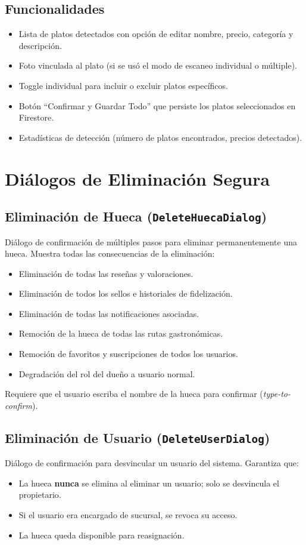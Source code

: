 \documentclass[11pt, a4paper, oneside]{report}
\begin{document}
\subsection{Funcionalidades}
\begin{itemize}
  \item Lista de platos detectados con opción de editar nombre, precio, categoría y descripción.
  \item Foto vinculada al plato (si se usó el modo de escaneo individual o múltiple).
  \item Toggle individual para incluir o excluir platos específicos.
  \item Botón ``Confirmar y Guardar Todo'' que persiste los platos seleccionados en Firestore.
  \item Estadísticas de detección (número de platos encontrados, precios detectados).
\end{itemize}

\section{Diálogos de Eliminación Segura}

\subsection{Eliminación de Hueca (\texttt{DeleteHuecaDialog})}
Diálogo de confirmación de múltiples pasos para eliminar permanentemente una hueca. Muestra todas las consecuencias de la eliminación:
\begin{itemize}
  \item Eliminación de todas las reseñas y valoraciones.
  \item Eliminación de todos los sellos e historiales de fidelización.
  \item Eliminación de todas las notificaciones asociadas.
  \item Remoción de la hueca de todas las rutas gastronómicas.
  \item Remoción de favoritos y suscripciones de todos los usuarios.
  \item Degradación del rol del dueño a usuario normal.
\end{itemize}
Requiere que el usuario escriba el nombre de la hueca para confirmar (\textit{type-to-confirm}).

\subsection{Eliminación de Usuario (\texttt{DeleteUserDialog})}
Diálogo de confirmación para desvincular un usuario del sistema. Garantiza que:
\begin{itemize}
  \item La hueca \textbf{nunca} se elimina al eliminar un usuario; solo se desvincula el propietario.
  \item Si el usuario era encargado de sucursal, se revoca su acceso.
  \item La hueca queda disponible para reasignación.
\end{itemize}
\end{document}
